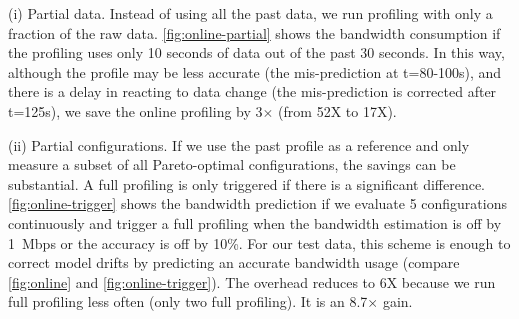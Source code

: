 (i) Partial data. Instead of using all the past data, we run profiling with only
a fraction of the raw data.  \autoref{fig:online-partial} shows the bandwidth
consumption if the profiling uses only 10 seconds of data out of the past 30
seconds. In this way, although the profile may be less accurate (the
mis-prediction at t=80-100s), and there is a delay in reacting to data change
(the mis-prediction is corrected after t=125s), we save the online profiling by
3$\times$ (from 52X to 17X).

(ii) Partial configurations. If we use the past profile as a reference and only
measure a subset of all Pareto-optimal configurations, the savings can be
substantial. A full profiling is only triggered if there is a significant
difference. \autoref{fig:online-trigger} shows the bandwidth prediction if we
evaluate 5 configurations continuously and trigger a full profiling when the
bandwidth estimation is off by \SI{1}{Mbps} or the accuracy is off by 10\%.  For
our test data, this scheme is enough to correct model drifts by predicting an
accurate bandwidth usage (compare \autoref{fig:online} and
\autoref{fig:online-trigger}).  The overhead reduces to 6X because we run full
profiling less often (only two full profiling). It is an 8.7$\times$ gain.

